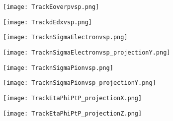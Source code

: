 \documentclass{beamer}
\begin{document}
\begin{frame}
  \begin{figure}[h!]
  \centering
  \texttt{[image: TrackEoverpvsp.png]}
  \end{figure}
\end{frame}

\begin{frame}
  \begin{figure}[h!]
  \centering
  \texttt{[image: TrackdEdxvsp.png]}
  \end{figure}
\end{frame}

\begin{frame}
  \begin{figure}[h!]
  \centering
  \texttt{[image: TracknSigmaElectronvsp.png]}
  \end{figure}
\end{frame}

\begin{frame}
  \begin{figure}[h!]
  \centering
  \texttt{[image: TracknSigmaElectronvsp\_projectionY.png]}
  \end{figure}
\end{frame}

\begin{frame}
  \begin{figure}[h!]
  \centering
  \texttt{[image: TracknSigmaPionvsp.png]}
  \end{figure}
\end{frame}

\begin{frame}
  \begin{figure}[h!]
  \centering
  \texttt{[image: TracknSigmaPionvsp\_projectionY.png]}
  \end{figure}
\end{frame}

\begin{frame}
  \begin{figure}[h!]
  \centering
  \texttt{[image: TrackEtaPhiPtP\_projectionX.png]}
  \end{figure}
\end{frame}

\begin{frame}
  \begin{figure}[h!]
  \centering
  \texttt{[image: TrackEtaPhiPtP\_projectionZ.png]}
  \end{figure}
\end{frame}
\end{document}
